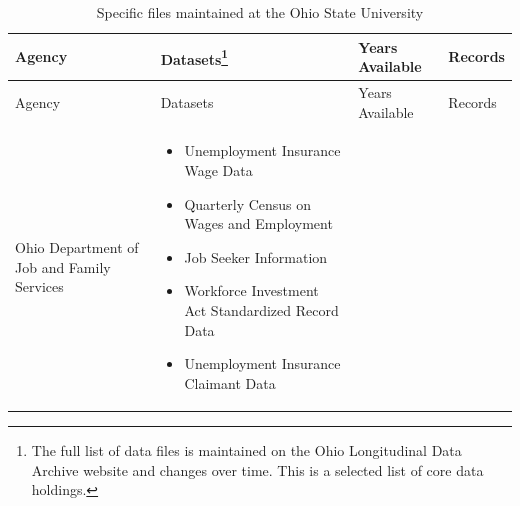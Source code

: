 \documentclass[
]{book}
\providecommand{\tightlist}{%
  \setlength{\itemsep}{0pt}\setlength{\parskip}{0pt}}
\begin{document}
\begin{longtable}[]{@{}llll@{}}
\caption{\label{tab:oldatable1} Specific files maintained at the Ohio State University}\tabularnewline
\toprule
\begin{minipage}[b]{0.19\columnwidth}\raggedright
Agency\strut
\end{minipage} & \begin{minipage}[b]{0.34\columnwidth}\raggedright
Datasets\footnote{The full list of
  data files is maintained
  on the Ohio Longitudinal
  Data Archive website and
  changes over time. This is
  a selected list of core
  data holdings.}\strut
\end{minipage} & \begin{minipage}[b]{0.18\columnwidth}\raggedright
Years
Available\strut
\end{minipage} & \begin{minipage}[b]{0.18\columnwidth}\raggedright
Records\strut
\end{minipage}\tabularnewline
\midrule
\endfirsthead
\toprule
\begin{minipage}[b]{0.19\columnwidth}\raggedright
Agency\strut
\end{minipage} & \begin{minipage}[b]{0.34\columnwidth}\raggedright
Datasets{}\strut
\end{minipage} & \begin{minipage}[b]{0.18\columnwidth}\raggedright
Years
Available\strut
\end{minipage} & \begin{minipage}[b]{0.18\columnwidth}\raggedright
Records\strut
\end{minipage}\tabularnewline
\midrule
\endhead
\begin{minipage}[t]{0.19\columnwidth}\raggedright
Ohio
Department
of Job and
Family
Services\strut
\end{minipage} & \begin{minipage}[t]{0.34\columnwidth}\raggedright
\begin{itemize}
\tightlist
\item
  Unemployment Insurance
  Wage Data
\item
  Quarterly Census on
  Wages and Employment
\item
  Job Seeker Information
\item
  Workforce Investment Act
  Standardized Record Data
\item
  Unemployment Insurance
  Claimant Data
\end{itemize}\strut
\end{minipage} & \begin{minipage}[t]{0.18\columnwidth}\raggedright

\end{minipage}
\end{longtable}
\end{document}
